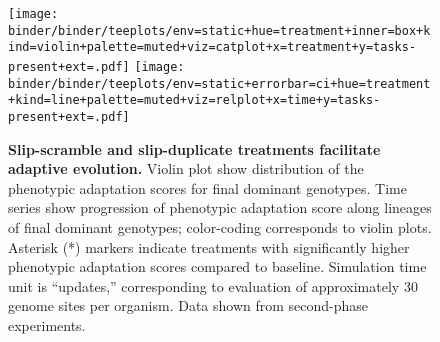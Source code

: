 \begin{figure}[!h]
  \texttt{[image: binder/binder/teeplots/env=static+hue=treatment+inner=box+kind=violin+palette=muted+viz=catplot+x=treatment+y=tasks-present+ext=.pdf]}%
   \texttt{[image: binder/binder/teeplots/env=static+errorbar=ci+hue=treatment+kind=line+palette=muted+viz=relplot+x=time+y=tasks-present+ext=.pdf]}

   \vspace{-2ex}

  \caption{\textbf{Slip-scramble and slip-duplicate treatments facilitate adaptive evolution.}
  \small Violin plot show distribution of the phenotypic adaptation scores for final dominant genotypes.
  Time series show progression of phenotypic adaptation score along lineages of final dominant genotypes;
  color-coding corresponds to violin plots.
  Asterisk (*) markers indicate treatments with significantly higher phenotypic adaptation scores compared to baseline.
  Simulation time unit is ``updates,'' corresponding to evaluation of approximately 30 genome sites per organism.
  Data shown from second-phase experiments.
}
  \label{fig:results_panels}
\end{figure}
